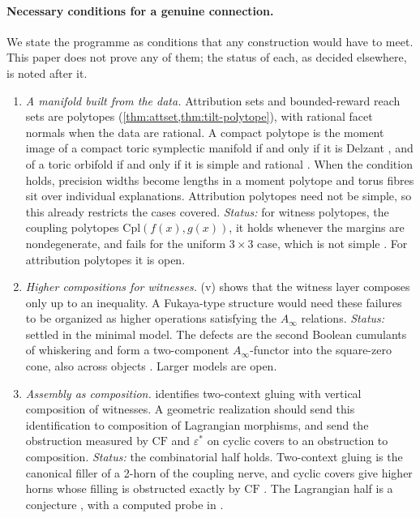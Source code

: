 \documentclass[11pt]{article}
\theoremstyle{definition}
\theoremstyle{remark}
\begin{document}
\paragraph{Necessary conditions for a genuine connection.} We state the programme as conditions that
any construction would have to meet. This paper does not prove any of them; the status of each, as decided elsewhere, is noted after it.
\begin{enumerate}[label=(F\arabic*),leftmargin=*]
\item \emph{A manifold built from the data.} Attribution sets and bounded-reward reach sets are
  polytopes (\cref{thm:attset,thm:tilt-polytope}), with rational facet normals when the data are
  rational. A compact polytope is the moment image of a compact toric symplectic manifold if and only if
  it is Delzant \cite{Delzant1988}, and of a toric orbifold if and only if it is simple and rational
  \cite{LermanTolman1997}. When the condition holds, precision widths become lengths in a moment
  polytope and torus fibres sit over individual explanations. Attribution polytopes need not be
  simple, so this already restricts the cases covered. \emph{Status:} for witness polytopes, the coupling polytopes
  $\mathrm{Cpl}(f(x),g(x))$, it holds whenever the margins are nondegenerate, and fails for the uniform $3\times3$ case,
  which is not simple \cite[Thm.~6.4]{Awasthi-Conditionals}. For attribution polytopes it is open.
\item \emph{Higher compositions for witnesses.} (v) shows that the witness layer
  composes only up to an inequality. A Fukaya-type structure would need these failures to be organized
  as higher operations satisfying the $A_\infty$ relations. \emph{Status:} settled in the minimal model. The defects are
  the second Boolean cumulants of whiskering and form a two-component $A_\infty$-functor into the square-zero cone, also
  across objects \cite[Thm.~5.2, Thm.~10.2]{Awasthi-Conditionals}. Larger models are open.
\item \emph{Assembly as composition.}  identifies two-context gluing with
  vertical composition of witnesses. A geometric realization should send this identification to
  composition of Lagrangian morphisms, and send the obstruction measured by $\mathrm{CF}$ and
  $\varepsilon^*$ on cyclic covers to an obstruction to composition. \emph{Status:} the combinatorial half holds.
  Two-context gluing is the canonical filler of a 2-horn of the coupling nerve, and cyclic covers give higher horns whose
  filling is obstructed exactly by $\mathrm{CF}$ \cite[Thm.~4.2, Thm.~4.3]{Awasthi-Conditionals}. The Lagrangian half is
  a conjecture \cite[Conj.~9.5]{Awasthi-Conditionals}, with a computed probe in \cite[\S10.4]{Awasthi-Conditionals}.
\end{enumerate}
\end{document}
